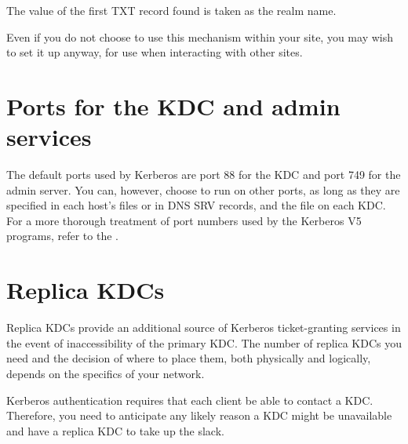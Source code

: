 \documentclass[letterpaper,10pt,english]{sphinxmanual}
\begin{document}
%
\begin{sphinxVerbatim}[commandchars=\\\{\}]
\end{sphinxVerbatim}

The value of the first TXT record found is taken as the realm name.

Even if you do not choose to use this mechanism within your site,
you may wish to set it up anyway, for use when interacting with other sites.


\section{Ports for the KDC and admin services}
\label{\detokenize{admin/realm_config:ports-for-the-kdc-and-admin-services}}
The default ports used by Kerberos are port 88 for the KDC and port
749 for the admin server.  You can, however, choose to run on other
ports, as long as they are specified in each host’s
{\hyperref[\detokenize{admin/conf_files/krb5_conf:krb5-conf-5}]{}} files or in DNS SRV records, and the
{\hyperref[\detokenize{admin/conf_files/kdc_conf:kdc-conf-5}]{}} file on each KDC.  For a more thorough treatment of
port numbers used by the Kerberos V5 programs, refer to the
{\hyperref[\detokenize{admin/appl_servers:conf-firewall}]{}}.


\section{Replica KDCs}
\label{\detokenize{admin/realm_config:replica-kdcs}}
Replica KDCs provide an additional source of Kerberos ticket-granting
services in the event of inaccessibility of the primary KDC.  The
number of replica KDCs you need and the decision of where to place them,
both physically and logically, depends on the specifics of your
network.

Kerberos authentication requires that each client be able to contact a
KDC.  Therefore, you need to anticipate any likely reason a KDC might
be unavailable and have a replica KDC to take up the slack.
\end{document}
